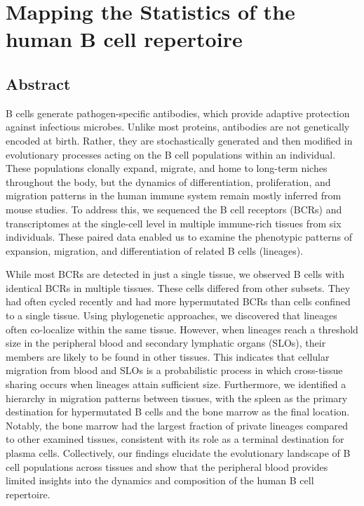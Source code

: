 \chapter{Mapping the Statistics of the human B cell repertoire}

\section{Abstract}
B cells generate pathogen-specific antibodies, which provide adaptive protection against infectious microbes. Unlike most proteins, antibodies are not genetically encoded at birth. Rather, they are stochastically generated and then modified in evolutionary processes acting on the B cell populations within an individual. These populations clonally expand, migrate, and home to long-term niches throughout the body, but the dynamics of differentiation, proliferation, and migration patterns in the human immune system remain mostly inferred from mouse studies. To address this, we sequenced the B cell receptors (BCRs) and transcriptomes at the single-cell level in multiple immune-rich tissues from six individuals. These paired data enabled us to examine the phenotypic patterns of expansion, migration, and differentiation of related B cells (lineages).

While most BCRs are detected in just a single tissue, we observed B cells with identical BCRs in multiple tissues. These cells differed from other subsets. They had often cycled recently and had more hypermutated BCRs than cells confined to a single tissue. Using phylogenetic approaches, we discovered that lineages often co-localize within the same tissue. However, when lineages reach a threshold size in the peripheral blood and secondary lymphatic organs (SLOs), their members are likely to be found in other tissues. This indicates that cellular migration from blood and SLOs is a probabilistic process in which cross-tissue sharing occurs when lineages attain sufficient size. Furthermore, we identified a hierarchy in migration patterns between tissues, with the spleen as the primary destination for hypermutated B cells and the bone marrow as the final location. Notably, the bone marrow had the largest fraction of private lineages compared to other examined tissues, consistent with its role as a terminal destination for plasma cells. Collectively, our findings elucidate the evolutionary landscape of B cell populations across tissues and show that the peripheral blood provides limited insights into the dynamics and composition of the human B cell repertoire.

